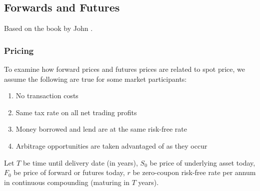 \subsection{Forwards and Futures}

Based on the book by John \cite{hull_2021}.

\subsubsection{Pricing}

To examine how forward prices and futures prices are related to spot price, we assume the following are true for some market participants:
\begin{enumerate}[label=\roman*.]
\setlength{\itemsep}{0pt}
\item No transaction costs
\item Same tax rate on all net trading profits
\item Money borrowed and lend are at the same risk-free rate
\item Arbitrage opportunities are taken advantaged of as they occur
\end{enumerate}

Let $T$ be time until delivery date (in years), $S_0$ be price of underlying asset today, $F_0$ be price of forward or futures today, $r$ be zero-coupon risk-free rate per annum in continuous compounding (maturing in $T$ years).\\

